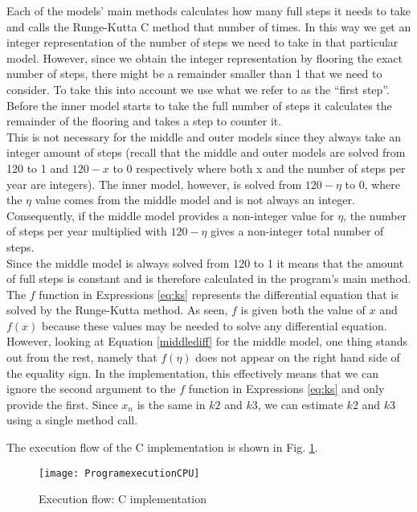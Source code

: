 Each of the models' main methods calculates how many full steps it needs to take and calls the Runge-Kutta C method that number of times. In this way we get an integer representation of the number of steps we need to take in that particular model. However, since we obtain the integer representation by flooring the exact number of steps, there might be a remainder smaller than 1 that we need to consider. To take this into account we use what we refer to as the ``first step''. Before the inner model starts to take the full number of steps it calculates the remainder of the flooring and takes a step to counter it. \\

This is not necessary for the middle and outer models since they always take an integer amount of steps (recall that the middle and outer models are solved from 120 to 1 and $120-x$ to 0 respectively where both x and the number of steps per year are integers). The inner model, however, is solved from $120-\eta$ to 0, where the $\eta$ value comes from the middle model and is not always an integer. Consequently, if the middle model provides a non-integer value for $\eta$, the number of steps per year multiplied with $120-\eta$ gives a non-integer total number of steps. \\

Since the middle model is always solved from 120 to 1 it means that the amount of full steps is constant and is therefore calculated in the program's main method. \\

The $f$ function in Expressions \ref{eq:ks} represents the differential equation that is solved by the Runge-Kutta method. As seen, $f$ is given both the value of $x$ and $f(x)$ because these values may be needed to solve any differential equation. However, looking at Equation \ref{middlediff} for the middle model, one thing stands out from the rest, namely that $f(\eta)$ does not appear on the right hand side of the equality sign. In the implementation, this effectively means that we can ignore the second argument to the $f$ function in Expressions \ref{eq:ks} and only provide the first. Since $x_n$ is the same in $k2$ and $k3$, we can estimate $k2$ and $k3$ using a single method call. 

The execution flow of the C implementation is shown in Fig. \ref{fig:cimplementation}.

\begin{figure}[ht!]
  \centering
    \texttt{[image: ProgramexecutionCPU]}
  \caption{Execution flow: C implementation}
  \label{fig:cimplementation}
\end{figure}